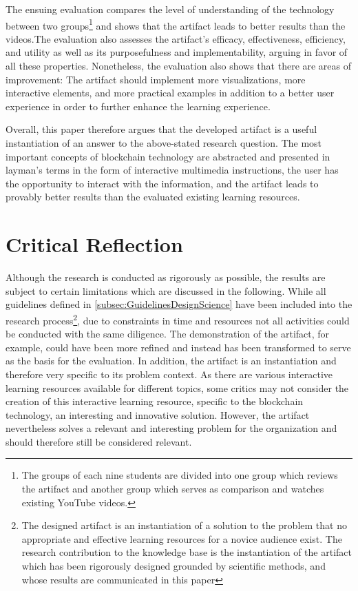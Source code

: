The ensuing evaluation compares the level of understanding of the technology between two groups\footnote{The groups of each nine students are divided into one group which reviews the artifact and another group which serves as comparison and watches existing YouTube videos.} and shows that the artifact leads to better results than the videos.The evaluation also assesses the artifact's efficacy, effectiveness, efficiency, and utility as well as its purposefulness and implementability, arguing in favor of all these properties. Nonetheless, the evaluation also shows that there are areas of improvement: The artifact should implement more visualizations, more interactive elements, and more practical examples in addition to a better user experience in order to further enhance the learning experience.

Overall, this paper therefore argues that the developed artifact is a useful instantiation of an answer to the above-stated research question. The most important concepts of blockchain technology are abstracted and presented in layman's terms in the form of interactive multimedia instructions, the user has the opportunity to interact with the information, and the artifact leads to provably better results than the evaluated existing learning resources.

\section{Critical Reflection} \label{sec:Reflection}
Although the research is conducted as rigorously as possible, the results are subject to certain limitations which are discussed in the following. 
While all guidelines defined in \ref{subsec:GuidelinesDesignScience} have been included into the research process\footnote{The designed artifact is an instantiation of a solution to the problem that no appropriate and effective learning resources for a novice audience exist. The research contribution to the knowledge base is the instantiation of the artifact which has been rigorously designed grounded by scientific methods, and whose results are communicated in this paper}, due to constraints in time and resources not all activities could be conducted with the same diligence. The demonstration of the artifact, for example, could have been more refined and instead has been transformed to serve as the basis for the evaluation. In addition, the artifact is an instantiation and therefore very specific to its problem context. As there are various interactive learning resources available for different topics, some critics may not consider the creation of this interactive learning resource, specific to the blockchain technology, an interesting and innovative solution. However, the artifact nevertheless solves a relevant and interesting problem for the organization and should therefore still be considered relevant. 

